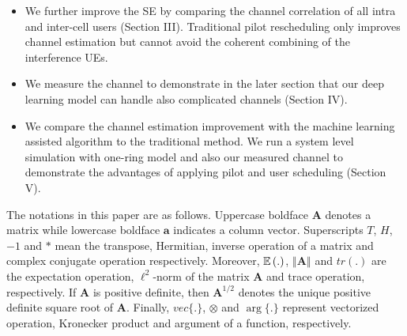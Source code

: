 \begin{itemize}
\item We further improve the SE by comparing the channel correlation of all intra and inter-cell users (Section III). Traditional pilot rescheduling only improves channel estimation but cannot avoid the coherent combining of the interference UEs.
\item We measure the channel to demonstrate in the later section that our deep learning model can handle also complicated channels (Section IV). 
\item We compare the channel estimation improvement with the machine learning assisted algorithm to the traditional method. We run a system level simulation with one-ring model and also our measured channel to demonstrate the advantages of applying pilot and user scheduling (Section V).
\end{itemize}
The notations in this paper are as follows. Uppercase boldface $\mathbf{A}$ denotes a matrix while lowercase
boldface $\mathbf{a}$ indicates a column vector.
Superscripts $T$, $H$, $-1$ and $*$ mean the transpose, Hermitian, inverse operation of a matrix and complex conjugate operation respectively. Moreover, $\operatorname{\mathbb{E}}{(.)}$, $\left\Vert\mathbf{A}\right\Vert$ and $tr(.)$ are the expectation operation, $\ell^2$-norm of the matrix $\mathbf{A}$ and trace operation, respectively. If $\mathbf{A}$ is positive definite, then $\mathbf{A}^{1/2}$ denotes the unique positive definite square root of $\mathbf{A}$. Finally, $vec\{.\}$, $\otimes$ and $\arg\{.\}$ represent vectorized operation, Kronecker product and argument of a function, respectively.  


